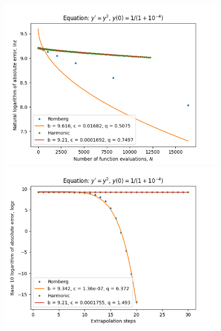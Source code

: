 \begin{figure}[H]
\centering
\begin{minipage}{0.45\textwidth}
\centering
\includegraphics[scale=0.45]{emr_plots/singularity_4_hp_trend.png}
\end{minipage}
\begin{minipage}{0.45\textwidth}
\centering
\includegraphics[scale=0.45]{emr_plots/singularity_4_hp_steps.png}
\end{minipage}
\end{figure}

